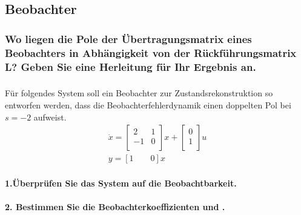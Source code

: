 \subsection{Beobachter}
\subsubsection{Wo liegen die Pole der Übertragungsmatrix eines Beobachters in Abhängigkeit von der Rückführungsmatrix
L? Geben Sie eine Herleitung für Ihr Ergebnis an.}
\subsubsection{}
Für folgendes System soll ein Beobachter zur Zustandsrekonstruktion so entworfen werden, dass
die Beobachterfehlerdynamik einen doppelten Pol bei $s=-2$ aufweist.
\begin{equation}
    \begin{array}{l}
        \dot{x}=\left[\begin{array}{cc}
            2&1\\
            -1&0\\
        \end{array}\right]x+\left[\begin{array}{c}
            0\\
            1\\
        \end{array}\right]u\\
        y=\left[1\qquad 0\right]x
    \end{array}
\end{equation}
\paragraph{1.Überprüfen Sie das System auf die Beobachtbarkeit.
}
\paragraph{2. Bestimmen Sie die Beobachterkoeffizienten und .
}